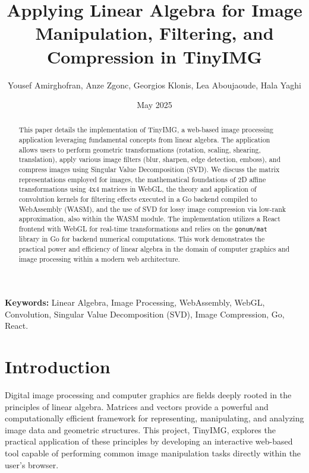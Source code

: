 \documentclass{article}
\title{Applying Linear Algebra for Image Manipulation, Filtering, and Compression in TinyIMG}
\author{Yousef Amirghofran, Anze Zgonc, Georgios Klonis, Lea Aboujaoude, Hala Yaghi}
\date{May 2025}
\begin{document}
\maketitle

\begin{abstract}
This paper details the implementation of TinyIMG, a web-based image processing application leveraging fundamental concepts from linear algebra. The application allows users to perform geometric transformations (rotation, scaling, shearing, translation), apply various image filters (blur, sharpen, edge detection, emboss), and compress images using Singular Value Decomposition (SVD). We discuss the matrix representations employed for images, the mathematical foundations of 2D affine transformations using 4x4 matrices in WebGL, the theory and application of convolution kernels for filtering effects executed in a Go backend compiled to WebAssembly (WASM), and the use of SVD for lossy image compression via low-rank approximation, also within the WASM module. The implementation utilizes a React frontend with WebGL for real-time transformations and relies on the \texttt{gonum/mat} library in Go for backend numerical computations. This work demonstrates the practical power and efficiency of linear algebra in the domain of computer graphics and image processing within a modern web architecture.
\end{abstract}

\textbf{Keywords:} Linear Algebra, Image Processing, WebAssembly, WebGL, Convolution, Singular Value Decomposition (SVD), Image Compression, Go, React.

\section{Introduction}
\label{sec:introduction}
Digital image processing and computer graphics are fields deeply rooted in the principles of linear algebra. Matrices and vectors provide a powerful and computationally efficient framework for representing, manipulating, and analyzing image data and geometric structures. This project, TinyIMG, explores the practical application of these principles by developing an interactive web-based tool capable of performing common image manipulation tasks directly within the user's browser.
\end{document}
